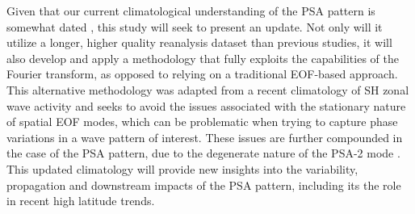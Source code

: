 Given that our current climatological understanding of the PSA pattern is somewhat dated \citep{Mo1998,Mo2001}, this study will seek to present an update. Not only will it utilize a longer, higher quality reanalysis dataset than previous studies, it will also develop and apply a methodology that fully exploits the capabilities of the Fourier transform, as opposed to relying on a traditional EOF-based approach. This alternative methodology was adapted from a recent climatology of SH zonal wave activity \citep{IrvingSimmonds2015} and seeks to avoid the issues associated with the stationary nature of spatial EOF modes, which can be problematic when trying to capture phase variations in a wave pattern of interest. These issues are further compounded in the case of the PSA pattern, due to the degenerate nature \citep{North1982} of the PSA-2 mode \citep[e.g. Figure 1;][]{Mo2000}. This updated climatology will provide new insights into the variability, propagation and downstream impacts of the PSA pattern, including its the role in recent high latitude trends. 

